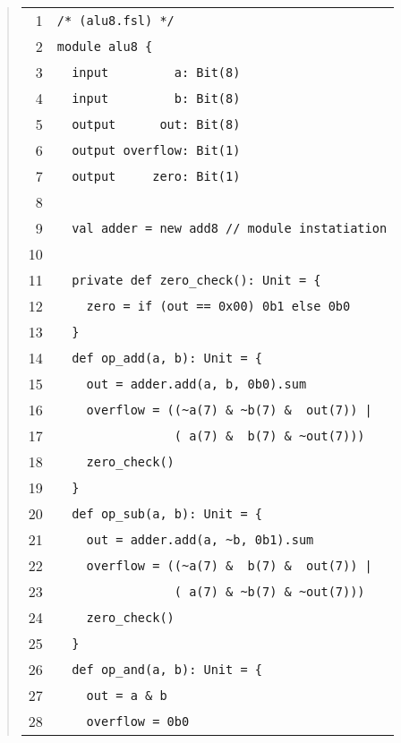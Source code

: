 %
\begin{quote}
\begin{tabular}{r|l}
    1 & \verb|/* (alu8.fsl) */| \\ [-3pt]
    2 & \verb|module alu8 {| \\ [-3pt]
    3 & \verb|  input         a: Bit(8)| \\ [-3pt]
    4 & \verb|  input         b: Bit(8)| \\ [-3pt]
    5 & \verb|  output      out: Bit(8)| \\ [-3pt]
    6 & \verb|  output overflow: Bit(1)| \\ [-3pt]
    7 & \verb|  output     zero: Bit(1)| \\ [-3pt]
    8 & \verb|| \\ [-3pt]
    9 & \verb|  val adder = new add8 // module instatiation| \\ [-3pt]
   10 & \verb|| \\ [-3pt]
   11 & \verb|  private def zero_check(): Unit = {| \\ [-3pt]
   12 & \verb|    zero = if (out == 0x00) 0b1 else 0b0| \\ [-3pt]
   13 & \verb|  }| \\ [-3pt]
   14 & \verb|  def op_add(a, b): Unit = {| \\ [-3pt]
   15 & \verb|    out = adder.add(a, b, 0b0).sum| \\ [-3pt]
   16 & \verb+    overflow = ((~a(7) & ~b(7) &  out(7)) |+ \\ [-3pt]
   17 & \verb|                ( a(7) &  b(7) & ~out(7)))| \\ [-3pt]
   18 & \verb|    zero_check()| \\ [-3pt]
   19 & \verb|  }| \\ [-3pt]
   20 & \verb|  def op_sub(a, b): Unit = {| \\ [-3pt]
   21 & \verb|    out = adder.add(a, ~b, 0b1).sum| \\ [-3pt]
   22 & \verb+    overflow = ((~a(7) &  b(7) &  out(7)) |+ \\ [-3pt]
   23 & \verb|                ( a(7) & ~b(7) & ~out(7)))| \\ [-3pt]
   24 & \verb|    zero_check()| \\ [-3pt]
   25 & \verb|  }| \\ [-3pt]
   26 & \verb|  def op_and(a, b): Unit = {| \\ [-3pt]
   27 & \verb|    out = a & b| \\ [-3pt]
   28 & \verb|    overflow = 0b0| \\ [-3pt]

\end{tabular}
\end{quote}
